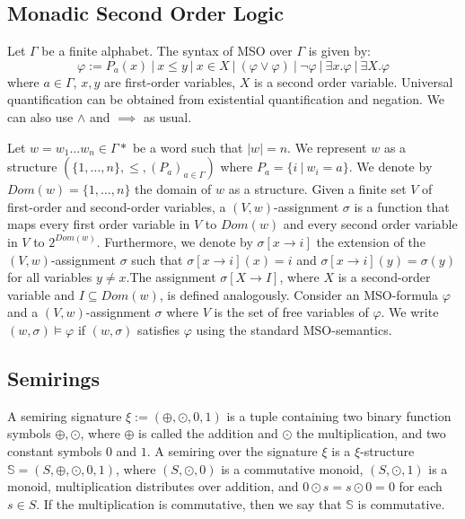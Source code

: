 \documentclass[12pt]{article}
\theoremstyle{definition}
\begin{document}
\subsection{Monadic Second Order Logic}

Let $\Gamma$ be a finite alphabet. The syntax of MSO over $\Gamma$ is given by:
$$ \varphi := P_a(x) \ | \ x \leq y \ | \ x \in X \ | \ (\varphi \lor \varphi) \ | \ \neg \varphi \ | \ \exists x. \varphi \ | \ \exists X . \varphi $$
where $a \in \Gamma$, $x, y$ are first-order variables, $X$ is a second order variable. Universal quantification can be obtained from existential quantification and negation. We can also use $\land$ and $\implies$ as usual.

Let $w = w_1\ldots w_n \in \Gamma*$ be a word such that $|w| = n$. We represent $w$ as a structure $(\{1,\ldots,n\}, \leq, (P_a)_{a \in \Gamma})$ where $P_a = \{i \ | \ w_i = a\}$. We denote by $Dom(w) = \{1,\ldots,n\}$ the domain of $w$ as a structure. Given a finite set $V$ of first-order and second-order variables, a $(V,w)$-assignment $\sigma$ is a function that maps every first order variable in $V$ to $Dom(w)$ and every second order variable in $V$ to $2^{Dom(w)}$. Furthermore, we denote by $\sigma[x \rightarrow i]$ the extension of the $(V,w)$-assignment $\sigma$ such that $\sigma[x \rightarrow i](x) = i$ and $\sigma[x \rightarrow i](y) = \sigma(y)$ for all variables $y \ne x$.The assignment $\sigma[X \rightarrow I]$, where $X$ is a second-order variable and $I \subseteq Dom(w)$, is defined analogously. Consider an MSO-formula $\varphi$ and a $(V,w)$-assignment $\sigma$ where $V$ is the set of free variables of $\varphi$. We write $(w, \sigma) \models \varphi$ if $(w, \sigma)$ satisfies $\varphi$ using the standard MSO-semantics.

\subsection{Semirings}

A semiring signature $\xi := (\oplus, \odot, 0, 1)$ is a tuple containing two binary function symbols $\oplus, \odot$, where $\oplus$ is called the addition and $\odot$ the multiplication, and two constant symbols $0$ and $1$. A semiring over the signature $\xi$ is a $\xi$-structure $\mathbb{S} = (S, \oplus, \odot, 0, 1)$, where $(S, \odot, 0)$ is a commutative monoid, $(S, \odot, 1)$ is a monoid, multiplication distributes over addition, and $0 \odot s = s \odot 0 = 0$ for each $s \in S$. If the multiplication is commutative, then we say that $\mathbb{S}$ is commutative.
\end{document}
